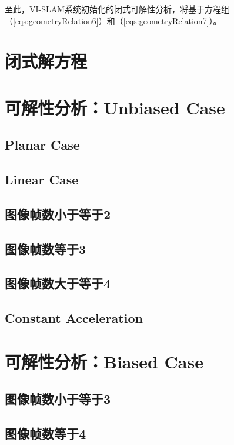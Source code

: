 \documentclass{article}
\begin{document}
\par
至此，VI-SLAM系统初始化的闭式可解性分析，将基于方程组（\ref{eqs:geometryRelation6}）和（\ref{eqs:geometryRelation7}）。


\section{闭式解方程}

\section{可解性分析：Unbiased Case}
\subsection{Planar Case}

\subsection{Linear Case}

\subsection{图像帧数小于等于2}

\subsection{图像帧数等于3}

\subsection{图像帧数大于等于4}

\subsection{Constant Acceleration}

\section{可解性分析：Biased Case}
\subsection{图像帧数小于等于3}

\subsection{图像帧数等于4}
\end{document}
